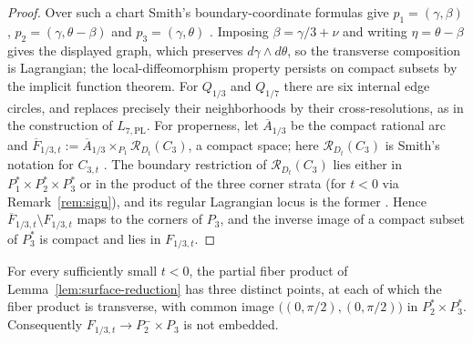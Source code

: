 \begin{proof}
Over such a chart Smith's boundary-coordinate formulas give $p_1=(\gamma,\beta)$,
$p_2=(\gamma,\theta-\beta)$ and $p_3=(\gamma,\theta)$ \cite[(3.1.1)--(3.1.6) and the proof of
Prop.~3.20]{Smith}.  Imposing $\beta=\gamma/3+\nu$ and writing
$\eta=\theta-\beta$ gives the displayed graph, which preserves $d\gamma\wedge d\theta$, so the
transverse composition is Lagrangian; the local-diffeomorphism property persists on compact subsets by
the implicit function theorem.  For $Q_{1/3}$ and $Q_{1/7}$ there are six internal edge circles, and
\cite[Thm.~4.22]{Smith} replaces precisely their neighborhoods by their cross-resolutions, as in the
construction of $L_{7,\mathrm{PL}}$.  For properness, let $\overline A_{1/3}$ be the compact rational arc and
$\overline F_{1/3,t}:=\overline A_{1/3}\times_{P_1}\mathcal R_{D_t}(C_3)$, a compact space; here
$\mathcal R_{D_t}(C_3)$ is Smith's notation for $C_{3,t}$ \cite[\S4.1]{Smith}.  The
boundary restriction of $\mathcal R_{D_t}(C_3)$ lies either in $P_1^*\times P_2^*\times P_3^*$ or in
the product of the three corner strata \cite[Prop.~4.3]{Smith} (for $t<0$ via Remark~\ref{rem:sign}), and its regular Lagrangian locus is
the former \cite[Cor.~4.11]{Smith}.  Hence $\overline F_{1/3,t}\setminus F_{1/3,t}$ maps to the corners
of $P_3$, and the inverse image of a compact subset of $P_3^*$ is compact and lies in $F_{1/3,t}$.
\end{proof}

\begin{proposition}\label{prop:partial-triple}
For every sufficiently small $t<0$, the partial fiber product of Lemma~\ref{lem:surface-reduction} has
three distinct points, at each of which the fiber product is transverse, with common image
$\bigl((0,\pi/2),(0,\pi/2)\bigr)$ in $P_2^*\times P_3^*$.  Consequently $F_{1/3,t}\to P_2^-\times P_3$ is not embedded.
\end{proposition}

